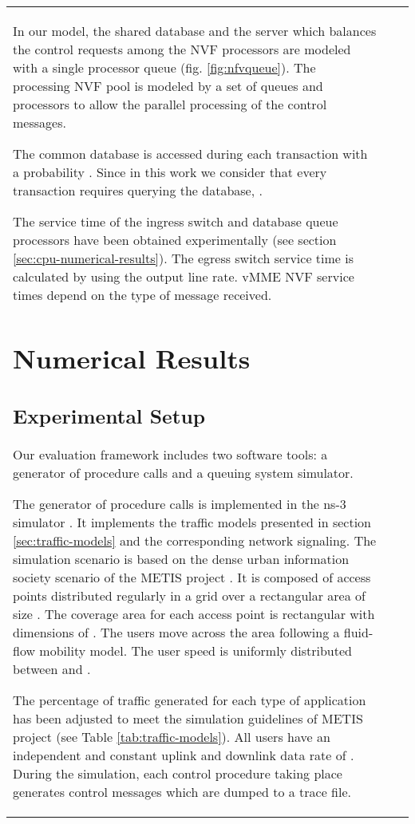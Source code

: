 \documentclass[conference]{IEEEtran}
\begin{document}
\begin{table*}[tb]
{\begin{tabularx}{\textwidth}{l|l|X}
{ In our model, the shared database and the server which balances the control requests among the NVF processors are modeled with a single processor queue (fig. \ref{fig:nfvqueue}). The processing NVF pool is modeled by a set of queues and processors to allow the parallel processing of the control messages. 


 The common database is accessed during each transaction with a probability . Since in this work we consider that every transaction requires querying the database, .
 
  The service time of the ingress switch and database queue processors have been obtained experimentally (see section \ref{sec:cpu-numerical-results}). The egress switch service time is calculated by using the output line rate. vMME NVF service times depend on the type of message received. 








\section{Numerical Results}
\label{sec:numerical-results}
\subsection{Experimental Setup}

Our evaluation framework includes two software tools: a generator of procedure calls and a queuing system simulator.

The generator of procedure calls is implemented in the ns-3 simulator \cite{ns3}. It implements the traffic models presented in section \ref{sec:traffic-models} and the corresponding network signaling. The simulation scenario is based on the dense urban information society scenario of the METIS project \cite{metis}. It is composed of  access points distributed regularly in a  grid over a rectangular area of size . The coverage area for each access point is rectangular with dimensions of . The users move across the area following a fluid-flow mobility model.
The user speed is uniformly distributed between  and .

The percentage of traffic generated for each type of application has been adjusted to meet the simulation guidelines of METIS project (see Table \ref{tab:traffic-models}). All users have an independent and constant uplink and downlink data rate of  \cite{metis}. During the simulation, each control procedure taking place generates control messages which are dumped to a trace file. 

}
\end{tabularx}}
\end{table*}
\end{document}

